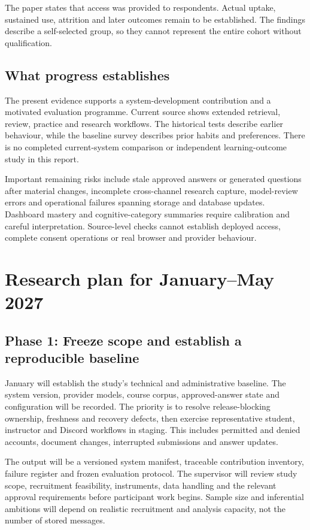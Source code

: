 \documentclass[11pt,a4paper]{article}
\begin{document}
The paper states that access was provided to respondents. Actual uptake, sustained use, attrition and later outcomes remain to be established. The findings describe a self-selected group, so they cannot represent the entire cohort without qualification.

\subsection{What progress establishes}
The present evidence supports a system-development contribution and a motivated evaluation programme. Current source shows extended retrieval, review, practice and research workflows. The historical tests describe earlier behaviour, while the baseline survey describes prior habits and preferences. There is no completed current-system comparison or independent learning-outcome study in this report.

Important remaining risks include stale approved answers or generated questions after material changes, incomplete cross-channel research capture, model-review errors and operational failures spanning storage and database updates. Dashboard mastery and cognitive-category summaries require calibration and careful interpretation. Source-level checks cannot establish deployed access, complete consent operations or real browser and provider behaviour.

\section{Research plan for January--May 2027}
\subsection{Phase 1: Freeze scope and establish a reproducible baseline}
January will establish the study's technical and administrative baseline. The system version, provider models, course corpus, approved-answer state and configuration will be recorded. The priority is to resolve release-blocking ownership, freshness and recovery defects, then exercise representative student, instructor and Discord workflows in staging. This includes permitted and denied accounts, document changes, interrupted submissions and answer updates.

The output will be a versioned system manifest, traceable contribution inventory, failure register and frozen evaluation protocol. The supervisor will review study scope, recruitment feasibility, instruments, data handling and the relevant approval requirements before participant work begins. Sample size and inferential ambitions will depend on realistic recruitment and analysis capacity, not the number of stored messages.
\end{document}
